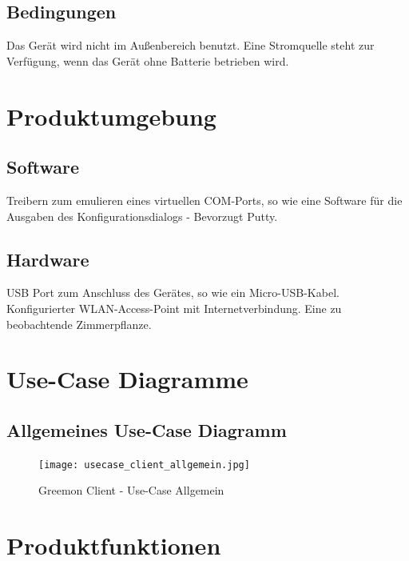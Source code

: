 \documentclass[pointlessnumbers]{scrartcl}
\begin{document}
\subsection{Bedingungen}
    Das Gerät wird nicht im Außenbereich benutzt. Eine Stromquelle steht zur Verfügung, wenn das Gerät ohne Batterie betrieben wird.
\section{Produktumgebung}
\subsection{Software}
    Treibern zum emulieren eines virtuellen COM-Ports, so wie eine Software für die Ausgaben des Konfigurationsdialogs - Bevorzugt Putty.
\subsection{Hardware}
    USB Port zum Anschluss des Gerätes, so wie ein Micro-USB-Kabel. Konfigurierter WLAN-Access-Point mit Internetverbindung. Eine zu beobachtende Zimmerpflanze.





\section{Use-Case Diagramme}
\subsection{Allgemeines Use-Case Diagramm}
\begin{figure}[htbp] 
  \centering
     \texttt{[image: usecase\_client\_allgemein.jpg]}
  \caption{Greemon Client - Use-Case Allgemein}
  \label{fig:Bild1}
\end{figure}

\section{Produktfunktionen}

\newpage
\end{document}
